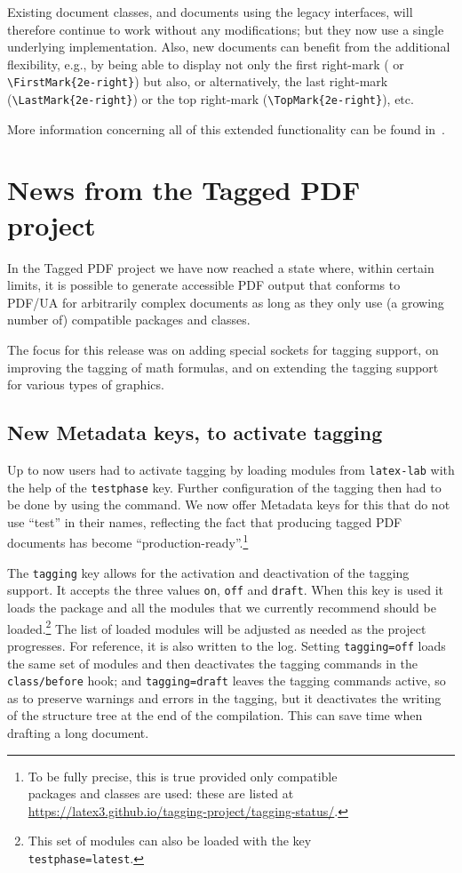 \documentclass{ltnews}
\begin{document}
Existing document classes, and documents using the legacy interfaces,
will therefore continue to work without any modifications; but they
now use a single underlying implementation. Also, new documents can
benefit from the additional flexibility, e.g., by being able to
display not only the first right-mark ( or
\verb=\FirstMark{2e-right}=) but also, or alternatively, the last
right-mark (\verb=\LastMark{2e-right}=) or the top right-mark
(\verb=\TopMark{2e-right}=), etc.

More information concerning all of this extended functionality can be
found in~\cite{41:ltmarks}.


\section{News from the Tagged PDF project}

In the Tagged PDF project we have now reached a state where, within
certain limits, it is possible to generate accessible PDF output that
conforms to PDF/UA for arbitrarily complex documents as long as they
only use (a growing number of) compatible packages and classes.

The focus for this release was on adding special sockets for tagging
support, on improving the tagging of math formulas, and on extending
the tagging support for various types of graphics.

\subsection{New Metadata keys, to activate tagging}

Up to now users had to activate tagging by loading modules from
\texttt{latex-lab} with the help of the \texttt{testphase}
key. Further configuration of the tagging then had to be done by using
the  command.  We now offer Metadata keys for this
that do not use \enquote{test} in their names, reflecting the fact
that producing tagged PDF documents has become
\enquote{production-ready}.\footnote{To be fully precise, this is true
provided only compatible\\
packages and classes are used: these are listed at\\
\url{https://latex3.github.io/tagging-project/tagging-status/}.}

The \texttt{tagging} key allows for the activation and deactivation of the
tagging support.  It accepts the three values \texttt{on},
\texttt{off} and \texttt{draft}.  When this key is used it loads the
 package and all the modules that we currently recommend 
should be loaded.\footnote{This set of modules can also be loaded with 
the key\\ \texttt{testphase=latest}.}
The list of loaded modules will be adjusted as needed as
the project progresses. For reference, it is also written to the log.
Setting \texttt{tagging=off} loads the 
same set of modules and then
deactivates the tagging commands in the \texttt{class/before} hook;
and \texttt{tagging=draft} leaves the tagging commands active, so as
to preserve warnings and errors in the tagging, but it deactivates the
writing of the structure tree at the end of the compilation. This can
save time when drafting a long document.
\end{document}
